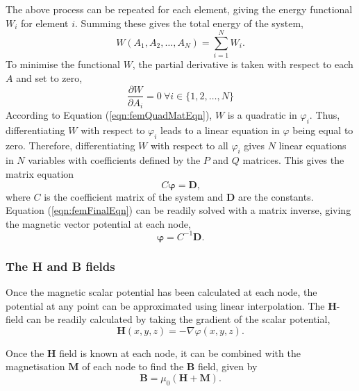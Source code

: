 The above process can be repeated for each element, giving the energy functional \(W_i\) for element \(i\). Summing these gives the total energy of the system,
\begin{equation}
    W\left(A_1,A_2,\dots,A_N\right) = \sum_{i = 1}^N W_i \text{.}
\end{equation}
To minimise the functional \(W\), the partial derivative is taken with respect to each \(A\) and set to zero,
\begin{equation}
    \frac{\partial W}{\partial A_i} = 0 \ \forall i \in \{1,2,\dots,N\}
\end{equation}
According to Equation (\ref{eqn:femQuadMatEqn}), \(W\) is a quadratic in \(\varphi_i\). Thus, differentiating \(W\) with respect to \(\varphi_i\) leads to a linear equation in \(\varphi\) being equal to zero. Therefore, differentiating \(W\) with respect to all \(\varphi_i\) gives \(N\) linear equations in \(N\) variables with coefficients defined by the \(P\) and \(Q\) matrices. This gives the matrix equation
\begin{equation}\label{eqn:femFinalEqn}
    C \bm{\varphi} = \mathbf{D} \text{,}
\end{equation}
where \(C\) is the coefficient matrix of the system and \(\mathbf{D}\) are the constants. Equation (\ref{eqn:femFinalEqn}) can be readily solved with a matrix inverse, giving the magnetic vector potential at each node,
\begin{equation}
    \bm{\varphi} = C^{-1}\mathbf{D} \text{.}
\end{equation}

\subsubsection*{The \textbf{H} and \textbf{B} fields}
Once the magnetic scalar potential has been calculated at each node, the potential at any point can be approximated using linear interpolation. The \(\mathbf{H}\)-field can be readily calculated by taking the gradient of the scalar potential,
\begin{equation}
    \mathbf{H}\left(x,y,z\right) = -\nabla \varphi\left(x,y,z\right) \text{.}
\end{equation}

Once the \(\mathbf{H}\) field is known at each node, it can be combined with the magnetisation \(\mathbf{M}\) of each node to find the \(\mathbf{B}\) field, given by
\begin{equation}
    \mathbf{B} = \mu_0 \left( \mathbf{H} + \mathbf{M} \right) \text{.}
\end{equation}


